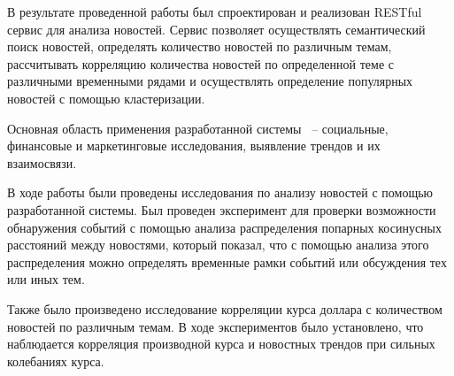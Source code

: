 
В результате проведенной работы был спроектирован и реализован RESTful сервис для анализа новостей. Сервис позволяет осуществлять семантический поиск новостей, определять количество новостей по различным темам, рассчитывать корреляцию количества новостей по определенной теме с различными временными рядами и осуществлять определение популярных новостей с помощью кластеризации.

Основная область применения разработанной системы ~-- социальные, финансовые и маркетинговые исследования, выявление трендов и их взаимосвязи.

В ходе работы были проведены исследования по анализу новостей с помощью разработанной системы. Был проведен эксперимент для проверки возможности обнаружения событий с помощью анализа распределения попарных косинусных расстояний между новостями, который показал, что с помощью анализа этого распределения можно определять временные рамки событий или обсуждения тех или иных тем.

Также было произведено исследование корреляции курса доллара с количеством новостей по различным темам. В ходе экспериментов было установлено, что наблюдается корреляция производной курса и новостных трендов при сильных колебаниях курса.
